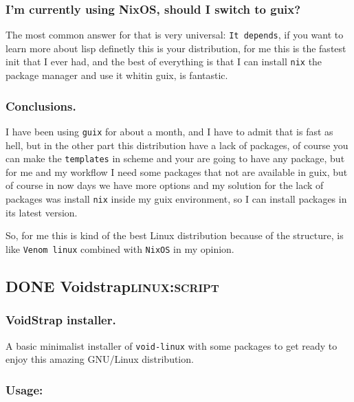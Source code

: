 \documentclass[11pt]{article}
\begin{document}
\subsubsection{I'm currently using NixOS, should I switch to guix?}
\label{sec:org13c0b00}
The most common answer for that is very universal: \texttt{It depends}, if you want to learn more about lisp definetly this is your distribution, for me this is the fastest init that I ever had, and the best of everything is that I can install \texttt{nix} the package manager and use it whitin guix, is fantastic.
\subsubsection{Conclusions.}
\label{sec:orgbb4297f}
I have been using \texttt{guix} for about a month, and I have to admit that is fast as hell, but in the other part this distribution have a lack of packages, of course you can make the \texttt{templates} in scheme and your are going to have any package, but for me and my workflow I need some packages that not are available in guix, but of course in now days we have more options and my solution for the lack of packages was install \texttt{nix} inside my guix environment, so I can install packages in its latest version.

So, for me this is kind of the best Linux distribution because of the structure, is like \texttt{Venom linux} combined with \texttt{NixOS} in my opinion.
\subsection{{\bfseries\sffamily DONE} Voidstrap\hfill{}\textsc{linux:script}}
\label{sec:org3beaf89}
\subsubsection{VoidStrap installer.}
\label{sec:org51d13bb}
A basic minimalist installer of \texttt{void-linux} with some packages to get ready to enjoy
this amazing GNU/Linux distribution.
\subsubsection{Usage:}
\label{sec:orgc6b0bda}
\end{document}
